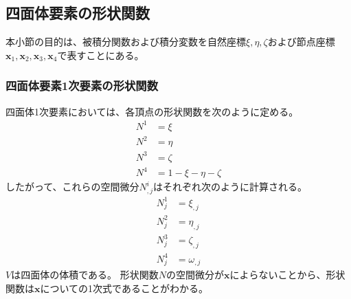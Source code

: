 \documentclass{jarticle}
\begin{document}
\subsection{四面体要素の形状関数}
本小節の目的は、被積分関数および積分変数を自然座標$\xi, \eta, \zeta$および節点座標$\bm{x}_1, \bm{x}_2, \bm{x}_3, \bm{x}_4$で表すことにある。
\subsubsection{四面体要素1次要素の形状関数}
四面体1次要素においては、各頂点の形状関数を次のように定める。
\begin{align}
  N^1 &= \xi\\
  N^2 &= \eta\\
  N^3 &= \zeta\\
  N^4 &= 1 - \xi - \eta - \zeta
\end{align}
したがって、これらの空間微分$N^i_{, j}$はそれぞれ次のように計算される。
\begin{align}
  N^1_j &= \xi_{,j}\\
  N^2_j &= \eta_{,j}\\
  N^3_j &= \zeta_{,j}\\
  N^4_j &= \omega_{,j}
\end{align}
$V$は四面体の体積である。
形状関数$N$の空間微分が$\bm{x}$によらないことから、形状関数は$\bm{x}$についての1次式であることがわかる。
\end{document}
